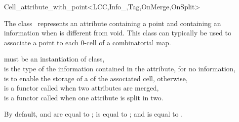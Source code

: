 \ccRefPageBegin
\begin{ccRefClass}{Cell_attribute_with_point<LCC,Info_,Tag,OnMerge,OnSplit>}


\ccDefinition
  
The class \ccRefName\ represents an attribute containing a point and
containing an information when  is different from void.
This class can typically be used to associate a point to each 0-cell
of a combinatorial map. 

\ccIsModel
{}

\ccInheritsFrom
{}

\ccParameters
{} must be an instantiation of  class,\\
 is the type of the information contained in the attribute,  for no information, \\
 is  to enable the storage of a
    of the associated cell,  otherwise,\\
 is a functor called when two attributes are merged,  \\
 is a functor called when one attribute is split in two. 

   By default,  and  are equal to
   ;  is equal to
   ; and  is equal to .

\ccTypes
{}
\ccGlue
{}
\ccGlue
{}

\ccSeeAlso
{}\\
\\

\end{ccRefClass}
\ccRefPageEnd
